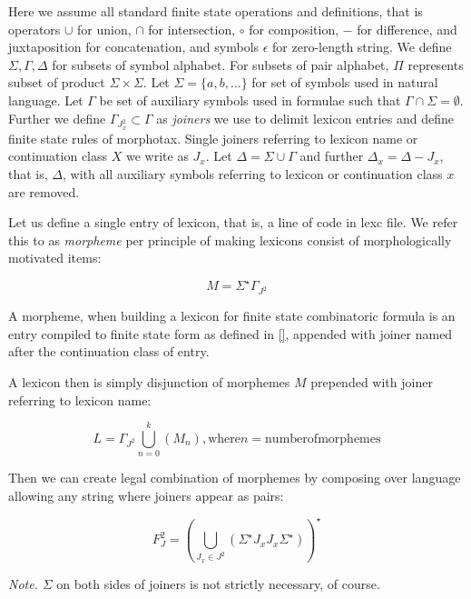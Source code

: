 \documentclass{llncs}
\begin{document}
Here we assume all standard finite state operations and definitions, that is operators
$\cup$ for union, $\cap$ for intersection, $\circ$ for composition, $-$ for
difference, and juxtaposition for concatenation, and symbols
$\epsilon$ for zero-length string. We define
$\Sigma, \Gamma, \Delta$ for subsets of symbol alphabet. For
subsets of pair alphabet, $\Pi$ represents subset of
product $\Sigma \times \Sigma$.
Let $\Sigma = \{a, b, \ldots\}$ for set of symbols used
in natural language.
Let $\Gamma$ be set of auxiliary symbols used in formulae such that
$\Gamma \cap \Sigma = \emptyset$. Further we define
$\Gamma_{J^{2}_{x}} \subset \Gamma$ as \emph{joiners} we use to delimit
lexicon entries and define finite state rules of morphotax. Single joiners
referring to lexicon name or continuation class $X$ we write as $J_{x}$.
Let $\Delta = \Sigma \cup \Gamma$ and further 
$\Delta_x = \Delta - J_x$, that is, $\Delta$, with all auxiliary symbols
referring to lexicon or continuation class $x$ are removed.

Let us define a single entry of lexicon, that is, a line of code in
lexc file. We refer this to as \emph{morpheme} per principle of making lexicons
consist of morphologically motivated items:

\begin{equation}
M = \Sigma^{\star} \Gamma_{J^{2}}
\end{equation}

A morpheme, when building a lexicon for finite state combinatoric formula is
an entry compiled to finite state form as defined in \ref{}, appended with
joiner named after the continuation class of entry.

A lexicon then is simply disjunction of morphemes $M$ prepended with joiner
referring to lexicon name:

\begin{equation}
L = \Gamma_{J^{2}} \bigcup_{n = 0}^{k}(M_{n}), \mathrm{where} n = 
\mathrm{number of morphemes}
\end{equation}

Then we can create legal combination of morphemes by composing over language
allowing any string where joiners appear as pairs:

\begin{equation}
F_J^2 = (\bigcup_{J_x \in J^2}(\Sigma^{\star} J_{x} J_{x} \Sigma^{\star}))^{\star} 
\end{equation}

\emph{Note.} $\Sigma$ on both sides of joiners is not strictly necessary, of
course.
\end{document}
